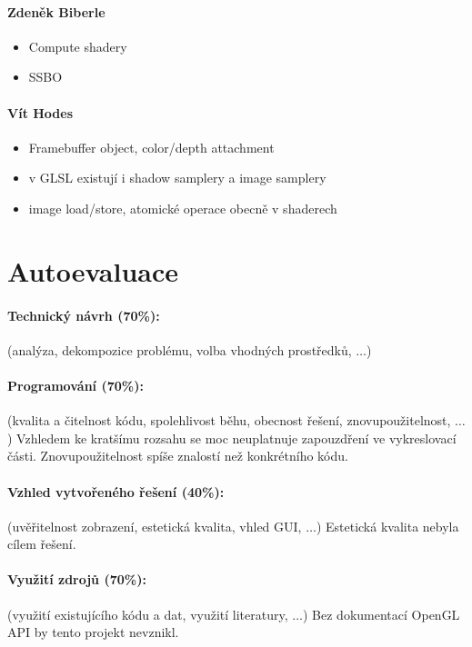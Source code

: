 \documentclass[11pt,a4paper]{article}
\begin{document}
\paragraph{Zdeněk Biberle}
\begin{itemize}
	\item Compute shadery
	\item SSBO
\end{itemize}

\paragraph{Vít Hodes}
\begin{itemize}
	\item Framebuffer object, color/depth attachment
	\item v GLSL existují i shadow samplery a image samplery
	\item image load/store, atomické operace obecně v shaderech
	
\end{itemize}

\section{Autoevaluace}

\paragraph{Technický návrh (70\%):} (analýza, dekompozice problému, volba
vhodných prostředků, $\ldots$) 


\paragraph{Programování (70\%):} (kvalita a čitelnost kódu, spolehlivost běhu,
obecnost řešení, znovupoužitelnost, $\ldots$)
Vzhledem ke kratšímu rozsahu se moc neuplatnuje zapouzdření ve vykreslovací části. Znovupoužitelnost
spíše znalostí než konkrétního kódu.

\paragraph{Vzhled vytvořeného řešení (40\%):} (uvěřitelnost zobrazení,
estetická kvalita, vhled GUI, $\ldots$)
Estetická kvalita nebyla cílem řešení.

\paragraph{Využití zdrojů (70\%):} (využití existujícího kódu a dat, využití
literatury, $\ldots$)
Bez dokumentací OpenGL API by tento projekt nevznikl.
\end{document}
